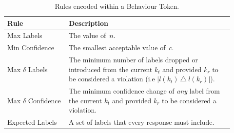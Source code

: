 \begin{table}[t]
    \centering
    \caption{Rules encoded within a Behaviour Token.}
    \label{tab:behaviour-token-rules}
    \small
    \begin{tabular}{p{0.25\linewidth}|p{0.675\linewidth}}
    \toprule
    \textbf{Rule} &
    \textbf{Description}\\
    \midrule
    Max Labels & The value of~$n$.\\
    Min Confidence & The smallest acceptable value of~$c$.\\
    Max $\delta$ Labels & The minimum number of labels dropped or introduced from the current $k_{t}$ and provided $k_{r}$ to be considered a violation (i.e $|l(k_{t})~\triangle~l(k_{r})|$).\\
    Max $\delta$ Confidence & The minimum confidence change of \textit{any} label from the current $k_{t}$ and provided $k_{r}$ to be considered a violation.\\
    Expected Labels & A set of labels that every response must include.\\
    \bottomrule
    \end{tabular}
\end{table}
